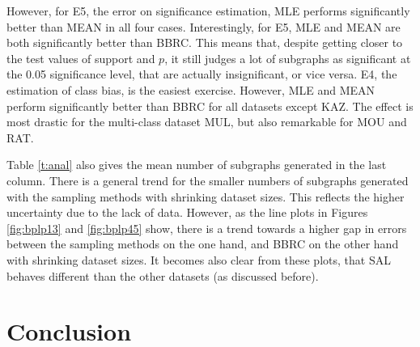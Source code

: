 \documentclass{article}
\begin{document}
However, for E5, the error on significance estimation, MLE performs significantly better than MEAN in all four cases. Interestingly, for E5, MLE and MEAN are both significantly better than BBRC. This means that, despite getting closer to the test values of support and $p$, it still judges a lot of subgraphs as significant at the 0.05 significance level, that are actually insignificant, or vice versa.
E4, the estimation of class bias, is the easiest exercise. However, MLE and MEAN perform significantly better than BBRC for all datasets except KAZ. The effect is most drastic for the multi-class dataset MUL, but also remarkable for MOU and RAT.

Table \ref{t:anal} also gives the mean number of subgraphs generated in the last column. There is a general trend for the smaller numbers of subgraphs generated with the sampling methods with shrinking dataset sizes. This reflects the higher uncertainty due to the lack of data. However, as the line plots in Figures \ref{fig:bplp13} and \ref{fig:bplp45} show, there is a trend towards a higher gap in errors between the sampling methods on the one hand, and BBRC on the other hand with shrinking dataset sizes. It becomes also clear from these plots, that SAL behaves different than the other datasets (as discussed before).


\section{Conclusion}
\label{s:Conclusion}




\end{document}
